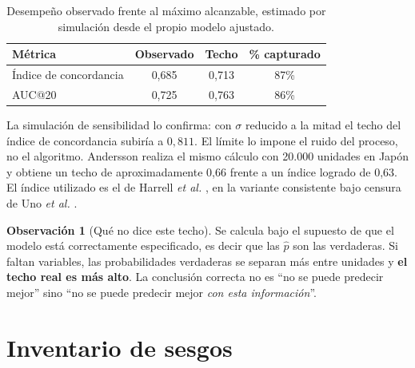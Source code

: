 \documentclass[11pt,a4paper]{article}
\theoremstyle{definition}
\newtheorem{observacion}{Observación}
\begin{document}
\begin{table}[h]
\centering
\begin{tabular}{@{}lccc@{}}
\toprule
Métrica & Observado & Techo & \% capturado \\
\midrule
Índice de concordancia & 0,685 & 0,713 & 87\% \\
AUC@20 & 0,725 & 0,763 & 86\% \\
\bottomrule
\end{tabular}
\caption{Desempeño observado frente al máximo alcanzable, estimado por simulación
desde el propio modelo ajustado.}
\end{table}

La simulación de sensibilidad lo confirma: con $\sigma$ reducido a la mitad el
techo del índice de concordancia subiría a $0{,}811$. El límite lo impone el ruido
del proceso, no el algoritmo. Andersson \cite{andersson2025} realiza el mismo
cálculo con 20.000 unidades en Japón y obtiene un techo de aproximadamente 0,66
frente a un índice logrado de 0,63. El índice utilizado es el de Harrell
\emph{et al.} \cite{harrell1982}, en la variante consistente bajo censura de Uno
\emph{et al.} \cite{uno2011}.

\begin{observacion}[Qué no dice este techo]
Se calcula bajo el supuesto de que el modelo está correctamente especificado, es
decir que las $\hat{p}$ son las verdaderas. Si faltan variables, las
probabilidades verdaderas se separan más entre unidades y \textbf{el techo real es
más alto}. La conclusión correcta no es ``no se puede predecir mejor'' sino ``no
se puede predecir mejor \emph{con esta información}''.
\end{observacion}

\section{Inventario de sesgos}
\end{document}

